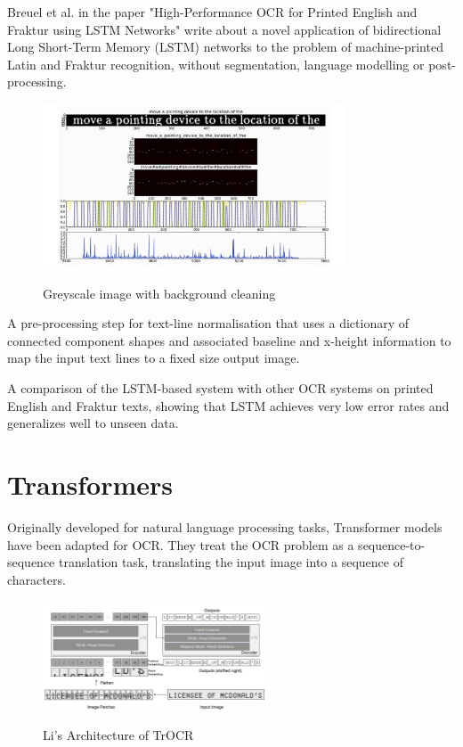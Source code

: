 Breuel et al. in the paper "High-Performance OCR for Printed English and Fraktur using LSTM Networks" write about a novel application of bidirectional Long Short-Term Memory (LSTM) networks to the problem of machine-printed Latin and Fraktur recognition, without segmentation, language modelling or post-processing.

\begin{figure}[ht]
    \centering
    \includegraphics[width=0.8\textwidth]{Figures/LSTM_Breuel.jpg}
    \caption[Bruel's illustration of the training steps of the LSTM recognizer]{Greyscale image with background cleaning}\cite{breuelHighPerformanceOCRPrinted2013}
    \label{fig:Breuel LSTM Paper}
\end{figure}



A pre-processing step for text-line normalisation that uses a dictionary of connected component shapes and associated baseline and x-height information to map the input text lines to a fixed size output image.

A comparison of the LSTM-based system with other OCR systems on printed English and Fraktur texts, showing that LSTM achieves very low error rates and generalizes well to unseen data.

\newpage

\section{Transformers}

Originally developed for natural language processing tasks, Transformer models have been adapted for OCR. They treat the OCR problem as a sequence-to-sequence translation task, translating the input image into a sequence of characters.

\begin{figure}[ht]
    \centering
    \includegraphics[width=0.6\textwidth]{Figures/Trans_MLi.jpg}
    \caption[Li's Architecture of TrOCR]{Li's Architecture of TrOCR}\cite{liTrOCRTransformerBasedOptical2023}
    \label{fig:Li's Architecture of TrOCR}
\end{figure}

